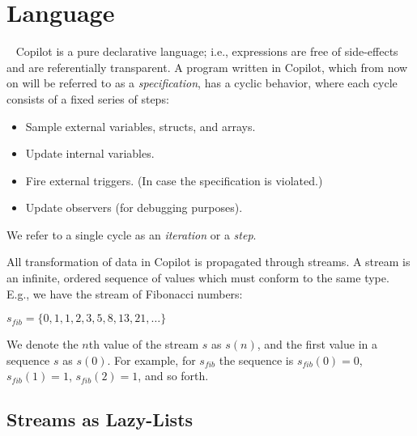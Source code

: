 
\section{Language}~\label{sec:language} Copilot is a pure declarative language;
i.e., expressions are free of side-effects and are referentially transparent.
%
A program written in Copilot, which from now on will be referred to as a
\emph{specification}, has a cyclic behavior, where each cycle consists of a
fixed series of steps:

\begin{itemize}
\item Sample external variables, structs, and arrays.
\item Update internal variables.
\item Fire external triggers. (In case the specification is violated.)
\item Update observers (for debugging purposes).
\end{itemize}

\noindent We refer to a single cycle as an \emph{iteration} or a \emph{step}.

All transformation of data in Copilot is propagated through streams.
%
A stream is an infinite, ordered sequence of values which must conform to the same type.
%
E.g., we have the stream of Fibonacci numbers:

\begin{center}
$s_{fib} = \{0, 1, 1, 2, 3, 5, 8, 13, 21, \dots \}$
\end{center}

\noindent We denote the $n$th value of the stream $s$ as $s(n)$, and the first
value in a sequence $s$ as $s(0)$.
%
For example, for $s_{fib}$ the sequence is $s_{fib}(0) = 0$,
$s_{fib}(1) = 1$, $s_{fib}(2) = 1$, and so forth.

\subsection{Streams as Lazy-Lists} \label{sec:stream}

